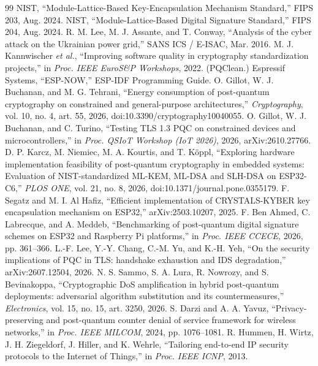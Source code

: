 \documentclass[conference]{IEEEtran}
\begin{document}
\begin{thebibliography}{99}
 NIST, ``Module-Lattice-Based Key-Encapsulation Mechanism Standard,'' FIPS 203, Aug. 2024.
 NIST, ``Module-Lattice-Based Digital Signature Standard,'' FIPS 204, Aug. 2024.
 R. M. Lee, M. J. Assante, and T. Conway, ``Analysis of the cyber attack on the Ukrainian power
grid,'' SANS ICS / E-ISAC, Mar. 2016.
 M. J. Kannwischer \emph{et al.}, ``Improving software quality in cryptography standardization
projects,'' in \emph{Proc. IEEE EuroS\&P Workshops}, 2022. (PQClean.)
 Espressif Systems, ``ESP-NOW,'' ESP-IDF Programming Guide.
 O. Gillot, W. J. Buchanan, and M. G. Tehrani, ``Energy consumption of post-quantum cryptography on
constrained and general-purpose architectures,'' \emph{Cryptography}, vol. 10, no. 4, art. 55, 2026,
doi:10.3390/cryptography10040055.
 O. Gillot, W. J. Buchanan, and C. Turino, ``Testing TLS 1.3 PQC on constrained devices and
microcontrollers,'' in \emph{Proc. QSIoT Workshop (IoT 2026)}, 2026, arXiv:2610.27766.
 D. P. Karcz, M. Niemiec, M. A. Kourtis, and T. K\"oppl, ``Exploring hardware implementation feasibility of post-quantum
cryptography in embedded systems: Evaluation of NIST-standardized ML-KEM, ML-DSA and SLH-DSA on ESP32-C6,''
\emph{PLOS ONE}, vol. 21, no. 8, 2026, doi:10.1371/journal.pone.0355179.
 F. Segatz and M. I. Al Hafiz, ``Efficient implementation of CRYSTALS-KYBER key encapsulation
mechanism on ESP32,'' arXiv:2503.10207, 2025.
 F. Ben Ahmed, C. Labrecque, and A. Meddeb, ``Benchmarking of post-quantum digital signature schemes
on ESP32 and Raspberry Pi platforms,'' in \emph{Proc. IEEE CCECE}, 2026, pp. 361--366.
 L.-F. Lee, Y.-Y. Chang, C.-M. Yu, and K.-H. Yeh, ``On the security implications of PQC in TLS:
handshake exhaustion and IDS degradation,'' arXiv:2607.12504, 2026.
 N. S. Sammo, S. A. Lura, R. Nowrozy, and S. Bevinakoppa, ``Cryptographic DoS amplification in hybrid
post-quantum deployments: adversarial algorithm substitution and its countermeasures,'' \emph{Electronics}, vol. 15,
no. 15, art. 3250, 2026.
 S. Darzi and A. A. Yavuz, ``Privacy-preserving and post-quantum counter denial of service framework
for wireless networks,'' in \emph{Proc. IEEE MILCOM}, 2024, pp. 1076--1081.
 R. Hummen, H. Wirtz, J. H. Ziegeldorf, J. Hiller, and K. Wehrle, ``Tailoring end-to-end IP security
protocols to the Internet of Things,'' in \emph{Proc. IEEE ICNP}, 2013.

\end{thebibliography}
\end{document}
